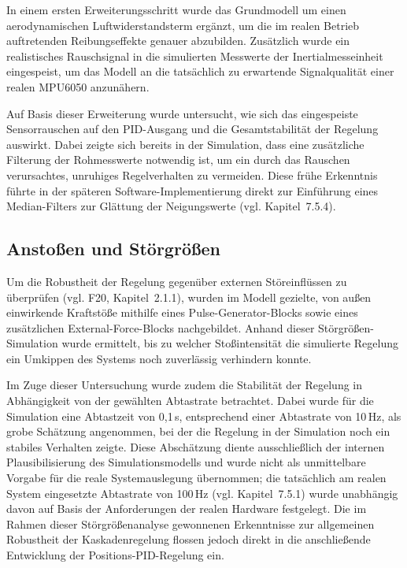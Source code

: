 \documentclass[12pt,ngerman,numbers=noenddot,abstracton,headsepline]{scrreprt}
\begin{document}
In einem ersten Erweiterungsschritt wurde das Grundmodell um einen aerodynamischen Luftwiderstandsterm ergänzt, um die im realen Betrieb auftretenden Reibungseffekte genauer abzubilden. Zusätzlich wurde ein realistisches Rauschsignal in die simulierten Messwerte der Inertialmesseinheit eingespeist, um das Modell an die tatsächlich zu erwartende Signalqualität einer realen MPU6050 anzunähern.

Auf Basis dieser Erweiterung wurde untersucht, wie sich das eingespeiste Sensorrauschen auf den PID-Ausgang und die Gesamtstabilität der Regelung auswirkt. Dabei zeigte sich bereits in der Simulation, dass eine zusätzliche Filterung der Rohmesswerte notwendig ist, um ein durch das Rauschen verursachtes, unruhiges Regelverhalten zu vermeiden. Diese frühe Erkenntnis führte in der späteren Software-Implementierung direkt zur Einführung eines Median-Filters zur Glättung der Neigungswerte (vgl. Kapitel~7.5.4).

\subsection{Anstoßen und Störgrößen}
\label{subsec:simulink_stoergroessen}

Um die Robustheit der Regelung gegenüber externen Störeinflüssen zu überprüfen (vgl. F20, Kapitel~2.1.1), wurden im Modell gezielte, von außen einwirkende Kraftstöße mithilfe eines Pulse-Generator-Blocks sowie eines zusätzlichen External-Force-Blocks nachgebildet. Anhand dieser Störgrößen-Simulation wurde ermittelt, bis zu welcher Stoßintensität die simulierte Regelung ein Umkippen des Systems noch zuverlässig verhindern konnte.

Im Zuge dieser Untersuchung wurde zudem die Stabilität der Regelung in Abhängigkeit von der gewählten Abtastrate betrachtet. Dabei wurde für die Simulation eine Abtastzeit von 0,1\,s, entsprechend einer Abtastrate von 10\,Hz, als grobe Schätzung angenommen, bei der die Regelung in der Simulation noch ein stabiles Verhalten zeigte. Diese Abschätzung diente ausschließlich der internen Plausibilisierung des Simulationsmodells und wurde nicht als unmittelbare Vorgabe für die reale Systemauslegung übernommen; die tatsächlich am realen System eingesetzte Abtastrate von 100\,Hz (vgl. Kapitel~7.5.1) wurde unabhängig davon auf Basis der Anforderungen der realen Hardware festgelegt. Die im Rahmen dieser Störgrößenanalyse gewonnenen Erkenntnisse zur allgemeinen Robustheit der Kaskadenregelung flossen jedoch direkt in die anschließende Entwicklung der Positions-PID-Regelung ein.
\end{document}
